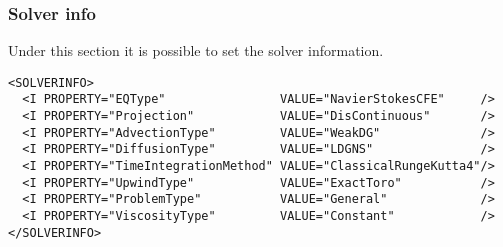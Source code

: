 \subsubsection*{Solver info}
Under this section it is possible to set the solver information.
\begin{lstlisting}[style=XmlStyle]       
<SOLVERINFO>
  <I PROPERTY="EQType"                VALUE="NavierStokesCFE"     />
  <I PROPERTY="Projection"            VALUE="DisContinuous"       />
  <I PROPERTY="AdvectionType"         VALUE="WeakDG"              />
  <I PROPERTY="DiffusionType"         VALUE="LDGNS"               />
  <I PROPERTY="TimeIntegrationMethod" VALUE="ClassicalRungeKutta4"/>
  <I PROPERTY="UpwindType"            VALUE="ExactToro"           />
  <I PROPERTY="ProblemType"           VALUE="General"             />
  <I PROPERTY="ViscosityType"         VALUE="Constant"            />
</SOLVERINFO>
\end{lstlisting}
